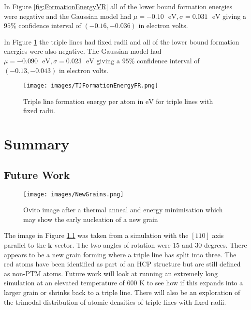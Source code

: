 \documentclass[12pt,a4paper,openany]{report}
\newcommand{\ts}[1]{\textrm{#1}}
\begin{document}
In Figure \ref{fig:FormationEnergyVR} all of the lower bound formation energies were negative and the Gaussian model had  $\mu = -0.10 \text{ } \ts{eV}, \sigma = 0.031 \text{ } \ts{eV}$ giving a $95\%$ confidence interval of $(-0.16,  -0.036)$ in electron volts.

In Figure \ref{fig:FormationEnergyFR} the triple lines had fixed radii and all of the lower bound formation energies were also negative. The Gaussian model had  $\mu = -0.090 \text{ } \ts{eV}, \sigma = 0.023 \text{ } \ts{eV}$ giving a $95\%$ confidence interval of $(-0.13,  -0.043)$ in electron volts.


\begin{figure}[H]
	\texttt{[image: images/TJFormationEnergyFR.png]} 
	\caption{Triple line formation energy per atom in $\ts{eV}$ for triple lines with fixed radii.}
	\label{fig:FormationEnergyFR}
\end{figure}



\newpage


\chapter{Summary} \label{ch:Summary}

\section{Future Work} \label{sec:FutureWork}


\begin{figure}[H]
	\centering
	\texttt{[image: images/NewGrains.png]}
	\caption{Ovito image after a thermal anneal and energy minimisation which may show the early nucleation of a new grain}
	\label{fig:NewGrains}
\end{figure}

The image in Figure \ref{fig:NewGrains} was taken from a  simulation with the $[1 1 0]$ axis parallel to the $\mathbf{k}$ vector. The two angles of rotation were 15 and 30 degrees. There appears to be a new grain forming where a triple line has split into three. The red atoms have been identified as part of an HCP structure but are still defined as non-PTM atoms. Future work will look at running an extremely long simulation at an elevated temperature of $600$ K to see how if this expands into a larger grain or shrinks back to a triple line. There will also be an exploration of the trimodal distribution of atomic densities of triple lines with fixed radii.
\end{document}
